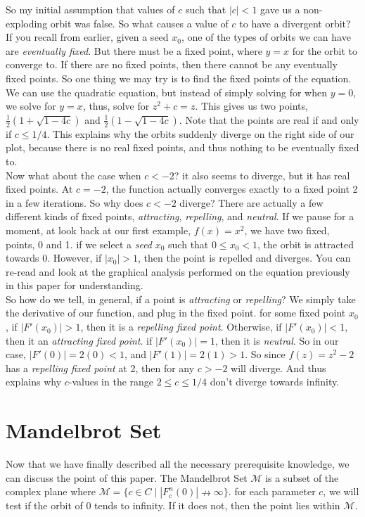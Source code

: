 \documentclass[20pt]{article} %
\begin{document}
So my initial assumption that values of $c$ such that $|c| < 1$ gave us a non-exploding orbit was false. So what causes a value of $c$ to have a divergent orbit?  If you recall from earlier, given a seed $x_0$, one of the types of orbits we can have are \textit{eventually fixed}. But there must be a fixed point, where $y=x$ for the orbit to converge to.  If there are no fixed points, then there cannot be any eventually fixed points.  So one thing we may try is to find the fixed points of the equation.  We can use the quadratic equation, but instead of simply solving for when $y=0$, we solve for $y=x$, thus, solve for $z^{2}+c=z$.  This gives us two points, $\frac{1}{2}(1+\sqrt{1-4c})$ and $\frac{1}{2}(1-\sqrt{1-4c})$.  Note that the points are real if and only if $c \leq 1/4$.  This explains why the orbits suddenly diverge on the right side of our plot, because there is no real fixed points, and thus nothing to be eventually fixed to. \\

\newpage
Now what about the case when $c < -2$? it also seems to diverge, but it has real fixed points. At $c = -2$, the function actually converges exactly to a fixed point 2 in a few iterations.  So why does $c < -2$ diverge? There are actually a few different kinds of fixed points, \textit{attracting}, \textit{repelling}, and \textit{neutral}.  If we pause for a moment, at look back at our first example, $f(x)=x^{2}$, we have two fixed, points, 0 and 1.  if we select a \textit{seed} $x_0$ such that $0 \leq x_0 < 1$, the orbit is attracted towards 0.  However, if $|x_0| > 1$, then the point is repelled and diverges.  You can re-read and look at the graphical analysis performed on the equation previously in this paper for understanding.  \\

So how do we tell, in general, if a point is \textit{attracting} or \textit{repelling}?  We simply take the derivative of our function, and plug in the fixed point. for some fixed point $x_0$, if $|F'(x_0)| > 1$, then it is a \textit{repelling fixed point}. Otherwise, if $|F'(x_0)| < 1$, then it an \textit{attracting fixed point}. if $|F'(x_0)| = 1$, then it is \textit{neutral}. So in our case, $|F'(0)| = 2(0) < 1$, and $|F'(1)| = 2(1) > 1$.  So since $f(z)=z^{2}-2$ has a \textit{repelling fixed point} at 2, then for any $c>-2$ will diverge. And thus explains why $c$-values in the range $2 \leq c \leq 1/4$ don't diverge towards infinity.


\section{Mandelbrot Set}
Now that we have finally described all the necessary prerequisite knowledge, we can discuss the point of this paper.  The Mandelbrot Set $\mathcal{M}$ is a subset of the complex plane where $\mathcal{M} = \{c \in \!C \mid | F_c^{n}(0)| \nrightarrow \infty \}$.  for each parameter $c$, we will test if the orbit of 0 tends to infinity.  If it does not, then the point lies within $\mathcal{M}$.
\end{document}
